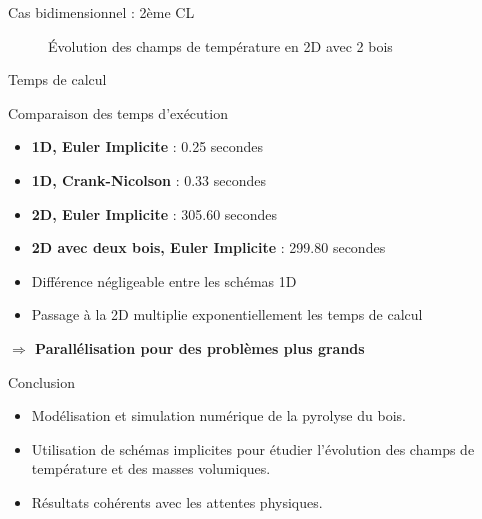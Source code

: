 \documentclass{beamer}
\begin{document}
\begin{frame}{Cas bidimensionnel : 2ème CL}

    \begin{figure}
        \centering
        \caption{\footnotesize Évolution des champs de température en 2D avec 2 bois}
    \end{figure}
\end{frame}

\begin{frame}{Temps de calcul}
    \begin{block}{Comparaison des temps d'exécution}
        \begin{itemize}
            \item \textbf{1D, Euler Implicite} : 0.25 secondes
            \item \textbf{1D, Crank-Nicolson} : 0.33 secondes
            \item \textbf{2D, Euler Implicite} : 305.60 secondes
            \item \textbf{2D avec deux bois, Euler Implicite} : 299.80 secondes
        \end{itemize}
    \end{block}
    \begin{itemize}
        \item Différence négligeable entre les schémas 1D
        \item Passage à la 2D multiplie exponentiellement les temps de calcul
    \end{itemize}
    \begin{block}{}
        \textbf{$\Longrightarrow$ Parallélisation pour des problèmes plus grands}
    \end{block}
\end{frame}

\begin{frame}{Conclusion}
    \begin{itemize}
        \item Modélisation et simulation numérique de la pyrolyse du bois.
        \item Utilisation de schémas implicites pour étudier l'évolution des champs de température et des masses volumiques.
        \item Résultats cohérents avec les attentes physiques.
    \end{itemize}
\end{frame}
\end{document}
